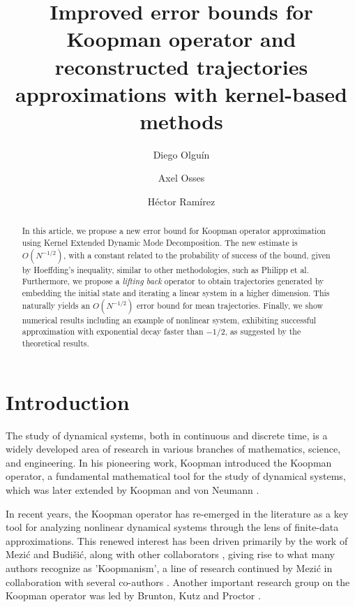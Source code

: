 \documentclass{article}
\title{Improved error bounds for Koopman operator and reconstructed trajectories approximations with kernel-based methods}
\author[1]{Diego Olguín}
\author[1]{Axel Osses}
\author[1]{Héctor Ramírez}
\affil[1]{Departamento de Ingeniería Matemática and Centro de Modelamiento Matemático (CNRS IRL2807), Universidad de Chile, Santiago, Chile}
\date{}  %
\begin{document}
\maketitle

\begin{abstract}
In this article, we propose a new error bound for Koopman operator approximation using Kernel Extended Dynamic Mode Decomposition. The new estimate is $O(N^{-1/2})$, with a constant related to the probability of success of the bound, given by Hoeffding's inequality, similar to other methodologies, such as Philipp et al. Furthermore, we propose a \textit{lifting back} operator to obtain trajectories generated by embedding the initial state and iterating a linear system in a higher dimension. This naturally yields an $O(N^{-1/2})$ error bound for mean trajectories. Finally, we show numerical results including an example of nonlinear system, exhibiting successful approximation with exponential decay faster than $-1/2$, as suggested by the theoretical results. 
\end{abstract}

\tableofcontents

\section{Introduction}
The study of dynamical systems, both in continuous and discrete time, is a widely developed area of research in various branches of mathematics, science, and engineering. In his pioneering work, Koopman \cite{Koopman1931HamiltonianSpace} introduced the Koopman operator, a fundamental mathematical tool for the study of dynamical systems, which was later extended by Koopman and von Neumann \cite{Koopman1932DynamicalSpectra}.

In recent years, the Koopman operator has re-emerged in the literature as a key tool for analyzing nonlinear dynamical systems through the lens of finite-data approximations. This renewed interest has been driven primarily by the work of Mezi\'c and Budi\v{s}i\'c, along with other collaborators \cite{Budisic2009AnObservables, Budisic2012GeometryFlows, Budisic2012AppliedKoopmanism}, giving rise to what many authors recognize as 'Koopmanism', a line of research continued by Mezi\'c in collaboration with several co-authors \cite{Arbabi2017StudyDecomposition,Mezic2013AnalysisOperator,Mezic2022OnOperator,Mezic2024ACases}. Another important research group on the Koopman operator was led by Brunton, Kutz and Proctor \cite{Baddoo2022KernelOptimization, Brunton2022ModernSystems, Proctor2016KoopmanControl, Proctor2018GeneralizingControl}.
\end{document}
